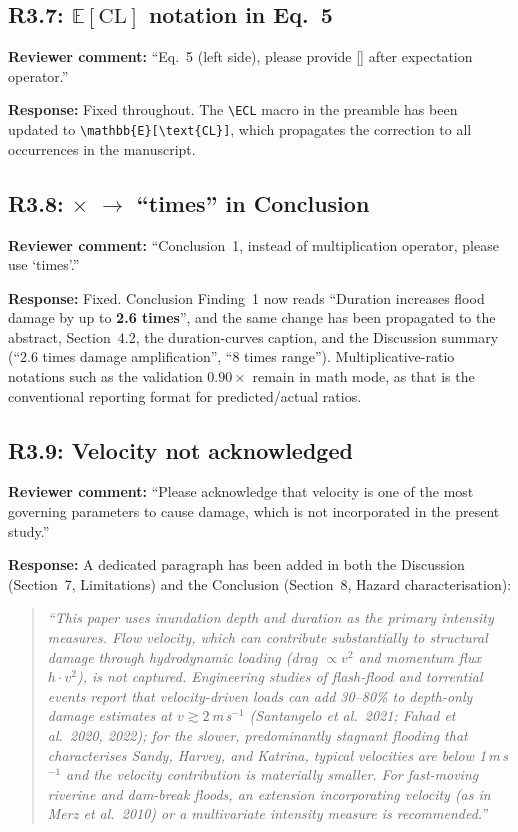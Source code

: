 \documentclass[11pt]{article}
\begin{document}
\subsection*{R3.7: $\mathbb{E}[\mathrm{CL}]$ notation in Eq.~5}

\textbf{Reviewer comment:} ``Eq.~5 (left side), please provide [] after expectation operator.''

\textbf{Response:} Fixed throughout. The \texttt{\textbackslash ECL} macro in the preamble has been updated to \texttt{\textbackslash mathbb\{E\}[\textbackslash text\{CL\}]}, which propagates the correction to all occurrences in the manuscript.

\subsection*{R3.8: $\times$ $\to$ ``times'' in Conclusion}

\textbf{Reviewer comment:} ``Conclusion~1, instead of multiplication operator, please use `times'.''

\textbf{Response:} Fixed. Conclusion Finding~1 now reads ``Duration increases flood damage by up to \textbf{2.6 times}'', and the same change has been propagated to the abstract, Section~4.2, the duration-curves caption, and the Discussion summary (``2.6 times damage amplification'', ``8 times range''). Multiplicative-ratio notations such as the validation $0.90\times$ remain in math mode, as that is the conventional reporting format for predicted/actual ratios.

\subsection*{R3.9: Velocity not acknowledged}

\textbf{Reviewer comment:} ``Please acknowledge that velocity is one of the most governing parameters to cause damage, which is not incorporated in the present study.''

\textbf{Response:} A dedicated paragraph has been added in both the Discussion (Section~7, Limitations) and the Conclusion (Section~8, Hazard characterisation):
\begin{quote}
\textit{``This paper uses inundation depth and duration as the primary intensity measures. Flow velocity, which can contribute substantially to structural damage through hydrodynamic loading (drag $\propto v^2$ and momentum flux $h \cdot v^2$), is not captured. Engineering studies of flash-flood and torrential events report that velocity-driven loads can add 30--80\% to depth-only damage estimates at $v \gtrsim 2$\,m\,s$^{-1}$ (Santangelo et al.\ 2021; Fahad et al.\ 2020, 2022); for the slower, predominantly stagnant flooding that characterises Sandy, Harvey, and Katrina, typical velocities are below 1\,m\,s$^{-1}$ and the velocity contribution is materially smaller. For fast-moving riverine and dam-break floods, an extension incorporating velocity (as in Merz et al.\ 2010) or a multivariate intensity measure is recommended.''}
\end{quote}
\end{document}
